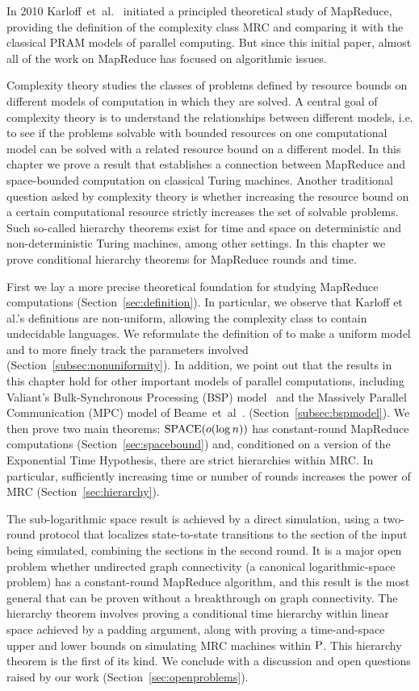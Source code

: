 In 2010 Karloff~et~al.~\cite{Karloff10} initiated a principled theoretical
study of MapReduce, providing the definition of the complexity class MRC and
comparing it with the classical PRAM models of parallel computing. But since
this initial paper, almost all of the work on MapReduce has focused on
algorithmic issues.

Complexity theory studies the classes of problems defined by resource bounds on
different models of computation in which they are solved. A central goal of
complexity theory is to understand the relationships between different models,
i.e. to see if the problems solvable with bounded resources on one
computational model can be solved with a related resource bound on a different
model.  In this chapter we prove a result that establishes a connection between
MapReduce and space-bounded computation on classical Turing machines.  Another
traditional question asked by complexity theory is whether increasing the
resource bound on a certain computational resource strictly increases the set
of solvable problems. Such so-called hierarchy theorems exist for time and
space on deterministic and non-deterministic Turing machines, among other
settings.  In this chapter we prove conditional hierarchy theorems for MapReduce
rounds and time.

First we lay a more precise theoretical foundation for studying MapReduce
computations (Section~\ref{sec:definition}).  In particular, we observe that
Karloff et al.'s definitions are non-uniform, allowing the complexity class to
contain undecidable languages.  We reformulate the definition of
\cite{Karloff10} to make a uniform model and to more finely track the
parameters involved (Section~\ref{subsec:nonuniformity}).  In addition, we
point out that the results in this chapter hold for other important models of
parallel computations, including Valiant's Bulk-Synchronous Processing (BSP)
model~\cite{Valiant90} and the Massively Parallel Communication (MPC) model of
Beame~et~al~\cite{BeameKS13}.  (Section~\ref{subsec:bspmodel}).  We then prove
two main theorems: $\SPACE(o(\log n))$ has constant-round MapReduce
computations (Section~\ref{sec:spacebound}) and, conditioned on a version of
the Exponential Time Hypothesis, there are strict hierarchies within MRC.  In
particular, sufficiently increasing time or number of rounds increases the
power of MRC (Section~\ref{sec:hierarchy}).

The sub-logarithmic space result is achieved by a direct simulation, using a
two-round protocol that localizes state-to-state transitions to the section of
the input being simulated, combining the sections in the second round. It is a
major open problem whether undirected graph connectivity (a canonical
logarithmic-space problem) has a constant-round MapReduce algorithm, and this 
result is the most general that can be proven without a breakthrough on graph
connectivity.  The hierarchy theorem involves proving a conditional time
hierarchy within linear space achieved by a padding argument, along with
proving a time-and-space upper and lower bounds on simulating MRC machines
within $\P$. This hierarchy theorem is the first of its kind. We conclude with
a discussion and open questions raised by our work
(Section~\ref{sec:openproblems}).


